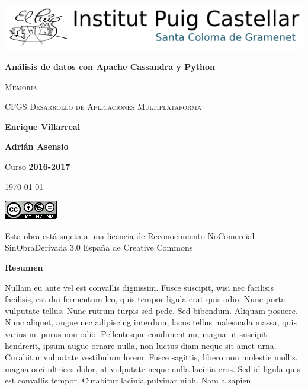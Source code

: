 \documentclass[14pt,a4paper,oneside,fleqn]{tmarticle}
\begin{document}
\pagestyle{fancy}
\begin{titlepage}
	\centering
        \includegraphics[scale=0.75]{puiglogo.png}\par\vspace{1,5cm}
            {\huge\bfseries Análisis de datos con Apache Cassandra y Python\par}
	\vspace{0.5cm}
	    {\scshape\Large Memoria\par}
	\vspace{0.5cm}
	    {\scshape\Large CFGS Desarrollo de Aplicaciones Multiplataforma\par}
	\vspace{6.0cm}
  \hfill{\Large\textbf{Enrique Villarreal}}\par
  \vspace{0.1cm}
  \hfill{\Large\textbf{Adrián Asensio}}\par  
        \vspace{1.5cm}
            \hfill{\large Curso \textbf{2016-2017}\par}
            \hfill{\large\today\par}
         \vspace{2cm}
         \begin{flushright}

        \includegraphics[scale=0.75]{creativecommons.png}\par\vspace{0.05cm}

           Esta obra está sujeta a una licencia de Reconocimiento-NoComercial-SinObraDerivada 3.0 España de Creative Commons
         \end{flushright}
        \vfill
\end{titlepage}
\thispagestyle{empty}
\textbf{Resumen}
\vspace{0.5cm}

Nullam eu ante vel est convallis dignissim.  Fusce suscipit, wisi nec facilisis facilisis, est dui fermentum leo, quis tempor ligula erat quis odio.  Nunc porta vulputate tellus.  Nunc rutrum turpis sed pede.  Sed bibendum.  Aliquam posuere.  Nunc aliquet, augue nec adipiscing interdum, lacus tellus malesuada massa, quis varius mi purus non odio.  Pellentesque condimentum, magna ut suscipit hendrerit, ipsum augue ornare nulla, non luctus diam neque sit amet urna.  Curabitur vulputate vestibulum lorem.  Fusce sagittis, libero non molestie mollis, magna orci ultrices dolor, at vulputate neque nulla lacinia eros.  Sed id ligula quis est convallis tempor.  Curabitur lacinia pulvinar nibh.  Nam a sapien.
\end{document}
